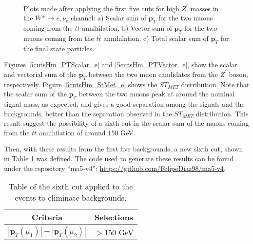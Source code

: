 \begin{figure}[ht!]
     \begin{center}
        \\
    \end{center}
    \vspace{-1\baselineskip}
    \caption{Plots made after applying the first five cuts for high $Z^{\prime}$ masses in the $W^{\pm}\rightarrow e, \nu_e$ channel: a) Scalar sum of $\bm{p}_T$ for the two muons coming from the $t\overline t$ annihilation, b) Vector sum of $\bm{p}_T$ for the two muons coming from the $t\overline{ t}$ annihilation, c) Total scalar sum of $\bm{p}_T$ for the final state particles.} 
   \label{5cutsHm_Results_e}
\end{figure}

Figures \ref{5cutsHm_PTScalar_e} and \ref{5cutsHm_PTVector_e}, show the scalar and vectorial sum of the $\bm{p}_T$ between the two muon candidates from the $Z^{\prime}$ boson, respectively. Figure \ref{5cutsHm_StMet_e} shows the $ST_{MET}$ distribution. Note that the scalar sum of the $\bm{p}_T$ between the two muons peak at around the nominal signal mass, as expected, and gives a good separation among the signals and the backgrounds, better than the separation observed in the $ST_{MET}$ distribution. This result suggest the possibility of a sixth cut in the scalar sum of the muons coming from the $t\overline t$ annihilation of around 150 GeV.

Then, with these results from the first five backgrounds, a new sixth cut, shown in Table \ref{cut6} was defined. The code used to generate these results can be found under the repository ``ma5-v4'': \url{https://github.com/FelipeDiaz98/ma5-v4}. 
\begin{table}[ht!]
\centering
\caption{Table of the sixth cut applied to the events to eliminate backgrounds.}
\label{cut6}
\begin{tabular}{cc}
\hline
\hline
 Criteria & Selections \\
\hline
 $|\bm{p}_T(\mu_1)| + |\bm{p}_T(\mu_2)|$ & $> 150$ GeV  \\
\hline
\hline
\end{tabular}
\end{table}

